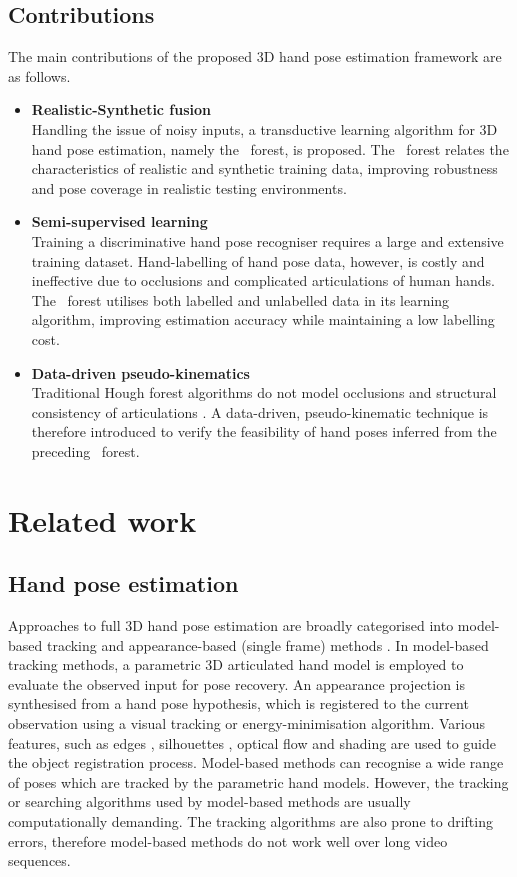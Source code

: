 \subsection{Contributions} 
The main contributions of the proposed 3D hand pose estimation framework are as follows. 

\begin{itemize}
\item{\textbf{Realistic-Synthetic fusion}}\\
Handling the issue of noisy inputs, a transductive learning algorithm for 3D hand pose estimation, namely the \STR\ forest, is proposed. The \STR\ forest relates the characteristics of realistic and synthetic training data, improving robustness and pose coverage in realistic testing environments.
\item{\textbf{Semi-supervised learning}}\\
Training a discriminative hand pose recogniser requires a large and extensive training dataset. Hand-labelling of hand pose data, however, is costly and ineffective due to occlusions and complicated articulations of human hands. 
The \STR\ forest utilises both labelled and unlabelled data in its learning algorithm, improving estimation accuracy while maintaining a low labelling cost. 
\item{\textbf{Data-driven pseudo-kinematics}}\\
	Traditional Hough forest algorithms do not model occlusions and structural consistency of articulations \cite{Gall2009}. A data-driven, pseudo-kinematic technique is therefore introduced to verify the feasibility of hand poses inferred from the preceding \STR\ forest.  
\end{itemize} 

\section{Related work}

\subsection{Hand pose estimation}

Approaches to full 3D hand pose estimation are broadly categorised into model-based tracking and appearance-based (single frame) methods \cite{Erol2007}. In model-based tracking methods, a parametric 3D articulated hand model is employed to evaluate the observed input for pose recovery. An appearance projection is synthesised from a hand pose hypothesis, which is registered to the current observation using a visual tracking or energy-minimisation algorithm. Various features, such as edges \cite{Guan2006}, silhouettes \cite{Wu2000}, optical flow \cite{Lu2003} and shading \cite{LaGorce2011} are used to guide the object registration process. 
Model-based methods can recognise a wide range of poses which are tracked by the parametric hand models.
However, the tracking or searching algorithms used by model-based methods are usually computationally demanding. The tracking algorithms are also prone to drifting errors, therefore model-based methods do not work well over long video sequences. 

